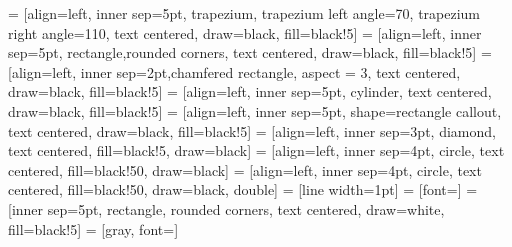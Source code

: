 \usetikzlibrary {intersections,through,arrows.meta,graphs,shapes.misc,positioning,shapes.misc,positioning,calc}
\usetikzlibrary{animations}
\usetikzlibrary {shapes.geometric}
\usetikzlibrary {animations}
\usetikzlibrary {shapes.multipart}
\usetikzlibrary {positioning}
\usetikzlibrary {fit,shapes.geometric}
\usetikzlibrary {automata}
\usetikzlibrary {quotes}
\usetikzlibrary {matrix}
\usetikzlibrary {backgrounds}
\usetikzlibrary {scopes}
\usetikzlibrary {calc}
\usetikzlibrary {intersections}
\usetikzlibrary {svg.path}
\usetikzlibrary {decorations}
\usetikzlibrary {patterns}
\usetikzlibrary {decorations.pathmorphing}
\usetikzlibrary {shadows}
\usetikzlibrary {bending}

 = [align=left, inner sep=5pt, trapezium, trapezium left angle=70, trapezium right angle=110, text centered, draw=black, fill=black!5]
 = [align=left, inner sep=5pt, rectangle,rounded corners, text centered, draw=black, fill=black!5]
 = [align=left, inner sep=2pt,chamfered rectangle, aspect = 3, text centered, draw=black, fill=black!5]
 = [align=left, inner sep=5pt, cylinder, text centered, draw=black, fill=black!5]
 = [align=left, inner sep=5pt, shape=rectangle callout, text centered, draw=black, fill=black!5]
 = [align=left, inner sep=3pt, diamond, text centered, fill=black!5, draw=black]
 = [align=left, inner sep=4pt, circle, text centered, fill=black!50, draw=black]
 = [align=left, inner sep=4pt, circle, text centered, fill=black!50, draw=black, double]
 = [line width=1pt]
 = [font=\normalsize]
 = [inner sep=5pt, rectangle, rounded corners, text centered, draw=white, fill=black!5]
 = [gray, font=\scriptsize]